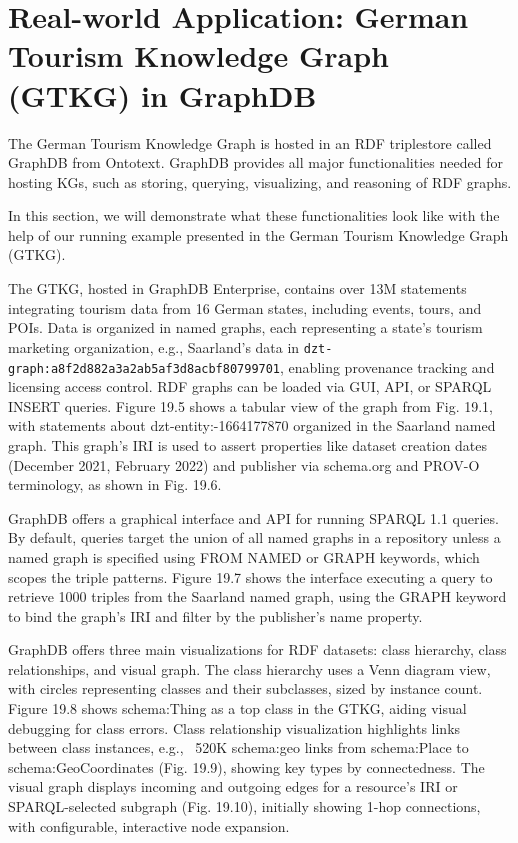 \documentclass[12pt]{article}
\begin{document}
\section{Real-world Application: German Tourism Knowledge Graph (GTKG) in GraphDB}
The German Tourism Knowledge Graph is hosted in an RDF triplestore called GraphDB from Ontotext. GraphDB provides all major functionalities needed for hosting KGs, such as storing, querying, visualizing, and reasoning of RDF graphs.

In this section, we will demonstrate what these functionalities look like with the help of our running example presented in the German Tourism Knowledge Graph (GTKG).

The GTKG, hosted in GraphDB Enterprise, contains over 13M statements integrating tourism data from 16 German states, including events, tours, and POIs. Data is organized in named graphs, each representing a state’s tourism marketing organization, e.g., Saarland’s data in \verb|dzt-graph:a8f2d882a3a2ab5af3d8acbf80799701|, enabling provenance tracking and licensing access control. RDF graphs can be loaded via GUI, API, or SPARQL INSERT queries. Figure 19.5 shows a tabular view of the graph from Fig. 19.1, with statements about dzt-entity:-1664177870 organized in the Saarland named graph. This graph’s IRI is used to assert properties like dataset creation dates (December 2021, February 2022) and publisher via schema.org and PROV-O terminology, as shown in Fig. 19.6.

GraphDB offers a graphical interface and API for running SPARQL 1.1 queries. By default, queries target the union of all named graphs in a repository unless a named graph is specified using FROM NAMED or GRAPH keywords, which scopes the triple patterns. Figure 19.7 shows the interface executing a query to retrieve 1000 triples from the Saarland named graph, using the GRAPH keyword to bind the graph’s IRI and filter by the publisher’s name property.

GraphDB offers three main visualizations for RDF datasets: class hierarchy, class relationships, and visual graph. The class hierarchy uses a Venn diagram view, with circles representing classes and their subclasses, sized by instance count. Figure 19.8 shows schema:Thing as a top class in the GTKG, aiding visual debugging for class errors. Class relationship visualization highlights links between class instances, e.g., ~520K schema:geo links from schema:Place to schema:GeoCoordinates (Fig. 19.9), showing key types by connectedness. The visual graph displays incoming and outgoing edges for a resource’s IRI or SPARQL-selected subgraph (Fig. 19.10), initially showing 1-hop connections, with configurable, interactive node expansion.
\end{document}
